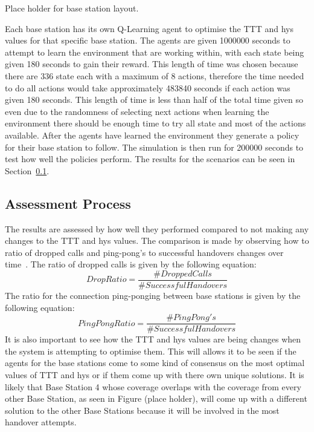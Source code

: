 Place holder for base station layout.

Each base station has its own Q-Learning agent to optimise the TTT and hys values for that specific base station. The agents are given 1000000 seconds to attempt to learn the environment that are working within, with each state being given 180 seconds to gain their reward. This length of time was chosen because there are 336 state each with a maximum of 8 actions, therefore the time needed to do all actions would take approximately 483840 seconds if each action was given 180 seconds. This length of time is less than half of the total time given so even due to the randomness of selecting next actions when learning the environment there should be enough time to try all state and most of the actions available. After the agents have learned the environment they generate a policy for their base station to follow. The simulation is then run for 200000 seconds to test how well the policies perform. The results for the scenarios can be seen in Section~\ref{results}.
\subsection{Assessment Process}\label{results}
The results are assessed by how well they performed compared to not making any changes to the TTT and hys values. The comparison is made by observing how to ratio of dropped calls and ping-pong's to successful handovers changes over time~\cite{sinclair2013advanced}. The ratio of dropped calls is given by the following equation:
\begin{equation}\label{eq:drop}
Drop Ratio = \frac{\#Dropped Calls}{\#Successful Handovers}
\end{equation}
The ratio for the connection ping-ponging between base stations is given by the following equation:
\begin{equation}\label{eq:ping}
PingPong Ratio = \frac{\#PingPong's}{\#Successful Handovers}
\end{equation}
It is also important to see how the TTT and hys values are being changes when the system is attempting to optimise them. This will allows it to be seen if the agents for the base stations come to some kind of consensus on the most optimal values of TTT and hys or if them come up with there own unique solutions. It is likely that Base Station 4 whose coverage overlaps with the coverage from every other Base Station, as seen in Figure (place holder), will come up with a different solution to the other Base Stations because it will be involved in the most handover attempts.


